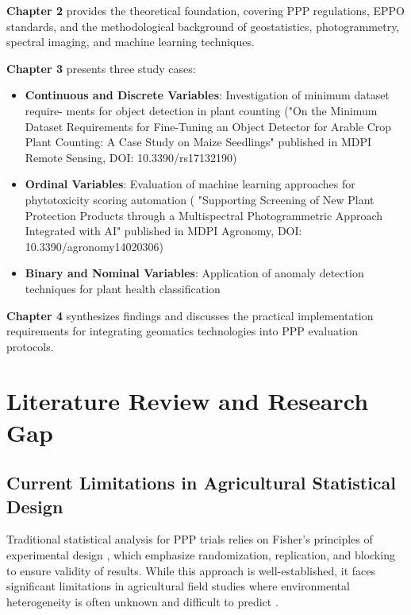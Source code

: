 \documentclass[12pt,a4paper,oneside]{report}
\begin{document}
\textbf{Chapter 2} provides the theoretical foundation, covering PPP regulations, EPPO standards, and the methodological background of geostatistics, photogrammetry, spectral imaging, and machine learning techniques.

\textbf{Chapter 3} presents three study cases:
\begin{itemize}
    \item \textbf{Continuous and Discrete Variables}: Investigation of minimum dataset require-
ments for object detection in plant counting ("On the Minimum Dataset Requirements for Fine-Tuning an
 Object Detector for Arable Crop Plant Counting: A Case Study
 on Maize Seedlings" published in MDPI Remote Sensing, DOI: 10.3390/rs17132190)
    \item \textbf{Ordinal Variables}: Evaluation of machine learning approaches for phytotoxicity scoring automation (
        "Supporting Screening of New Plant Protection Products through a Multispectral Photogrammetric Approach Integrated with AI" published in MDPI Agronomy, DOI: 10.3390/agronomy14020306)  
    \item \textbf{Binary and Nominal Variables}: Application of anomaly detection techniques for plant health classification
\end{itemize}

\textbf{Chapter 4} synthesizes findings and discusses the practical implementation requirements for integrating geomatics technologies into PPP evaluation protocols.

\section{Literature Review and Research Gap}

\subsection{Current Limitations in Agricultural Statistical Design}

Traditional statistical analysis for PPP trials relies on Fisher's principles of experimental design \cite{fisherStatisticalMethodsResearch1992,meadStatisticalPrinciplesDesign2012,caslerFundamentalsExperimentalDesign2015}, which emphasize randomization, replication, and blocking to ensure validity of results. While this approach is well-established, it faces significant limitations in agricultural field studies where environmental heterogeneity is often unknown and difficult to predict \cite{paroliniPursuitScienceAgriculture2015,berryResistedRiseRandomisation2015}.
\end{document}
